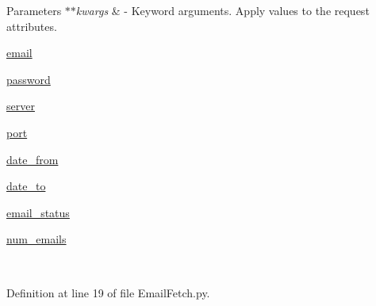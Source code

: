 \begin{DoxyParams}{Parameters}
{\em $\ast$$\ast$kwargs} & -\/ Keyword arguments. Apply values to the request attributes.
\begin{DoxyItemize}
\item \hyperlink{classRappCloud_1_1CloudMsgs_1_1EmailFetch_1_1EmailFetch_1_1Request_ac5899d360316acf4fdd7531ffd6e91e4}{email}
\item \hyperlink{classRappCloud_1_1CloudMsgs_1_1EmailFetch_1_1EmailFetch_1_1Request_a08bce5b96f45195daadc488ebe126894}{password}
\item \hyperlink{classRappCloud_1_1CloudMsgs_1_1EmailFetch_1_1EmailFetch_1_1Request_a388ba1968b842e1d8b26000320e5f7bc}{server}
\item \hyperlink{classRappCloud_1_1CloudMsgs_1_1EmailFetch_1_1EmailFetch_1_1Request_a02b001ea07a0f2887a916a74fcedb5a4}{port}
\item \hyperlink{classRappCloud_1_1CloudMsgs_1_1EmailFetch_1_1EmailFetch_1_1Request_a2e5c0120bb2bb330e9f3506b477865a9}{date\-\_\-from}
\item \hyperlink{classRappCloud_1_1CloudMsgs_1_1EmailFetch_1_1EmailFetch_1_1Request_ab8cbfb113421da0d7a9d42cbb896cc81}{date\-\_\-to}
\item \hyperlink{classRappCloud_1_1CloudMsgs_1_1EmailFetch_1_1EmailFetch_1_1Request_a1b1a7543a71977d2388ed62dc98abf64}{email\-\_\-status}
\item \hyperlink{classRappCloud_1_1CloudMsgs_1_1EmailFetch_1_1EmailFetch_1_1Request_af5cc8347f1223b107c4be3f1c98718ad}{num\-\_\-emails} 
\end{DoxyItemize}\\
\hline
\end{DoxyParams}


Definition at line 19 of file Email\-Fetch.\-py.



